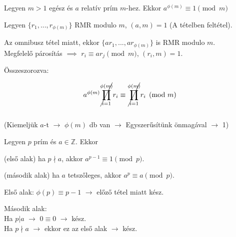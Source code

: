 \begin{frame}
  \begin{tcolorbox}[title={Tétel: Euler-Fermat tétel}]
    Legyen $m > 1$ egész és $a$ relatív prím $m$-hez. Ekkor $a^{{\phi}(m)} \equiv 1 \pmod{m}$
  \tcblower
    \mmedskip
    
    Legyen $\{ r_1, ..., r_{{\phi}(m)}\}$ RMR modulo $m$, $(a, m) = 1$ (A tételben feltétel).\\
    \msmallskip

    Az omnibusz tétel miatt, ekkor $\{ ar_1, ..., ar_{{\phi}(m)}\}$ is RMR modulo $m$.\\
    Megfelelő párosítás $\implies$ $r_i \equiv ar_j \pmod{m}$,  $(r_i, m) = 1$.\\
    \msmallskip
    
    Összeszorozva:\\
    \msmallskip
    
    $$a^{{\phi}(m)} \cancel{\prod^{{\phi}(m)}_{i=1}} r_i \equiv \cancel{\prod^{{\phi}(m)}_{i=1}} r_i \pmod{m}$$\\
    (Kiemeljük $a$-t $\rightarrow$ ${\phi}(m)$ db van $\rightarrow$ Egyszerűsítünk önmagával $\rightarrow$ 1)
  \end{tcolorbox}
\end{frame}

\begin{frame}
  \begin{tcolorbox}[title={Tétel: (Kis) Fermat tétel}]
    Legyen $p$ prím és $a \in \mathbb{Z}$. Ekkor\\
    \mtinyskip
    
    (első alak) ha $p \nmid a$, akkor $a^{p-1} \equiv 1 \pmod{p}$.\\
    \mtinyskip
    
    (második alak) ha $a$ tetszőleges, akkor $a^p \equiv a \pmod{p}$.
  \tcblower
    \mmedskip
    
    Első alak: ${\phi}(p) \equiv p - 1$ $\rightarrow$ előző tétel miatt kész.\\
    \mmedskip

    Második alak:\\
    Ha $p|a$ $\rightarrow$ $0 \equiv 0$ $\rightarrow$ kész.\\
    Ha $p{\nmid}a$ $\rightarrow$ ekkor ez az első alak $\rightarrow$ kész.
  \end{tcolorbox}
\end{frame}

